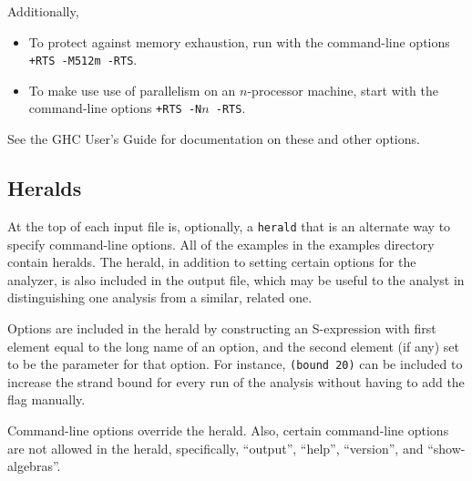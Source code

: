 Additionally,

\begin{itemize}
  \item To protect {\cpsa} against memory exhaustion, run {\cpsa} with
    the command-line options \verb|+RTS -M512m -RTS|.

  \item To make use use of parallelism on an $n$-processor machine,
    start {\cpsa} with the command-line options \verb|+RTS -N|$n$\verb| -RTS|.
\end{itemize}

See the GHC User's Guide \cite{ghcUsersGuide} for documentation on these and other options.

\subsection{Heralds}
\label{sec:heralds}
At the top of each {\cpsa} input file is, optionally, a \texttt{herald}
that is an alternate way to specify command-line options.  All of the
examples in the examples directory contain heralds.  The herald, in
addition to setting certain options for the analyzer, is also included
in the output file, which may be useful to the analyst in
distinguishing one analysis from a similar, related one.

Options are included in the herald by constructing an S-expression
with first element equal to the long name of an option, and the second
element (if any) set to be the parameter for that option.  For instance,
\texttt{(bound 20)} can be included to increase the strand bound for
every run of the analysis without having to add the flag manually.

Command-line options override the herald.  Also, certain command-line
options are not allowed in the herald, specifically, ``output'',
``help'', ``version'', and ``show-algebras''.

